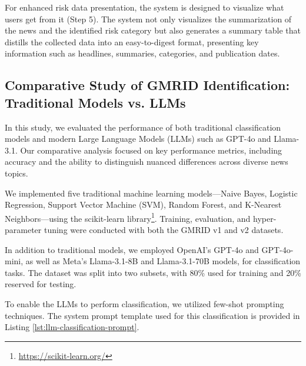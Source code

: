 For enhanced risk data presentation, the system is designed to visualize what users get from it (Step 5). The system not only visualizes the summarization of the news and the identified risk category but also generates a summary table that distills the collected data into an easy-to-digest format, presenting key information such as headlines, summaries, categories, and publication dates. 

\subsection{Comparative Study of GMRID Identification: Traditional Models vs. LLMs}

In this study, we evaluated the performance of both traditional classification models and modern Large Language Models (LLMs) such as GPT-4o and Llama-3.1. Our comparative analysis focused on key performance metrics, including accuracy and the ability to distinguish nuanced differences across diverse news topics.

We implemented five traditional machine learning models---Naive Bayes, Logistic Regression, Support Vector Machine (SVM), Random Forest, and K-Nearest Neighbors---using the scikit-learn library\footnote{\url{https://scikit-learn.org/}}. Training, evaluation, and hyper-parameter tuning were conducted with both the GMRID v1 and v2 datasets.

In addition to traditional models, we employed OpenAI’s GPT-4o and GPT-4o-mini, as well as Meta's Llama-3.1-8B and Llama-3.1-70B models, for classification tasks. The dataset was split into two subsets, with 80\% used for training and 20\% reserved for testing.

To enable the LLMs to perform classification, we utilized few-shot prompting techniques. The system prompt template used for this classification is provided in Listing \ref{lst:llm-classification-prompt}.

